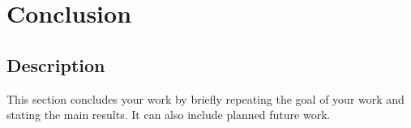 \section{Conclusion}
\subsection{Description}
This section concludes your work by briefly repeating the
goal of your work and stating the main results. It can also
include planned future work.
